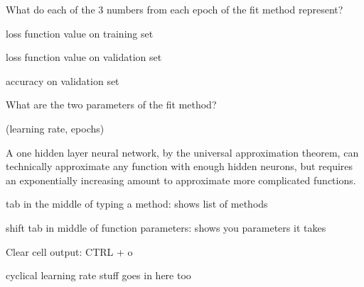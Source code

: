 \documentclass[12pt]{article}
\begin{document}
What do each of the 3 numbers from each epoch of the fit method represent?

loss function value on training set

loss function value on validation set

accuracy on validation set



What are the two parameters of the fit method?

(learning rate, epochs)




A one hidden layer neural network, by the universal approximation theorem, can technically approximate any function with enough hidden neurons, but requires an exponentially increasing amount to approximate more complicated functions.


tab in the middle of typing a method: shows list of methods

shift tab in middle of function parameters: shows you parameters it takes




Clear cell output: CTRL + o


cyclical learning rate stuff goes in here too
\end{document}
